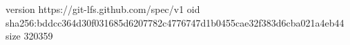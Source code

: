 version https://git-lfs.github.com/spec/v1
oid sha256:bddcc364d30f031685d6207782c4776747d1b0455cae32f383d6cba021a4eb44
size 320359
